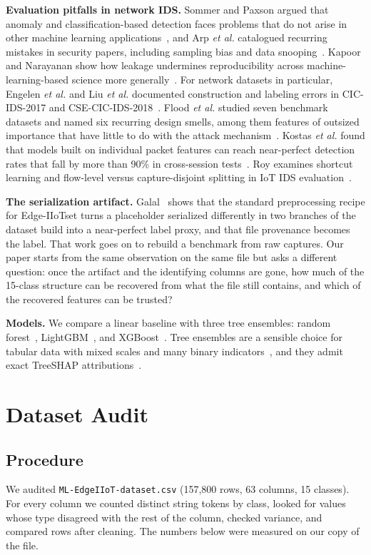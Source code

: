 \documentclass[journal]{IEEEtran}
\begin{document}
\textbf{Evaluation pitfalls in network IDS.} Sommer and Paxson argued that anomaly and classification-based detection faces problems that do not arise in other machine learning applications~\cite{sommer2010}, and Arp \emph{et al.} catalogued recurring mistakes in security papers, including sampling bias and data snooping~\cite{arp2022}. Kapoor and Narayanan show how leakage undermines reproducibility across machine-learning-based science more generally~\cite{kapoor2023}. For network datasets in particular, Engelen \emph{et al.} and Liu \emph{et al.} documented construction and labeling errors in CIC-IDS-2017 and CSE-CIC-IDS-2018~\cite{engelen2021,liu2022}. Flood \emph{et al.} studied seven benchmark datasets and named six recurring design smells, among them features of outsized importance that have little to do with the attack mechanism~\cite{flood2024}. Kostas \emph{et al.} found that models built on individual packet features can reach near-perfect detection rates that fall by more than 90\% in cross-session tests~\cite{kostas2025}. Roy examines shortcut learning and flow-level versus capture-disjoint splitting in IoT IDS evaluation~\cite{roy2026}.

\textbf{The serialization artifact.} Galal~\cite{galal2026} shows that the standard preprocessing recipe for Edge-IIoTset turns a placeholder serialized differently in two branches of the dataset build into a near-perfect label proxy, and that file provenance becomes the label. That work goes on to rebuild a benchmark from raw captures. Our paper starts from the same observation on the same file but asks a different question: once the artifact and the identifying columns are gone, how much of the 15-class structure can be recovered from what the file still contains, and which of the recovered features can be trusted?

\textbf{Models.} We compare a linear baseline with three tree ensembles: random forest~\cite{breiman2001}, LightGBM~\cite{ke2017}, and XGBoost~\cite{chen2016}. Tree ensembles are a sensible choice for tabular data with mixed scales and many binary indicators~\cite{grinsztajn2022}, and they admit exact TreeSHAP attributions~\cite{lundberg2020}.

\section{Dataset Audit}\label{sec:audit}
\subsection{Procedure}
We audited \texttt{ML-EdgeIIoT-dataset.csv} (157,800 rows, 63 columns, 15 classes). For every column we counted distinct string tokens by class, looked for values whose type disagreed with the rest of the column, checked variance, and compared rows after cleaning. The numbers below were measured on our copy of the file.
\end{document}
